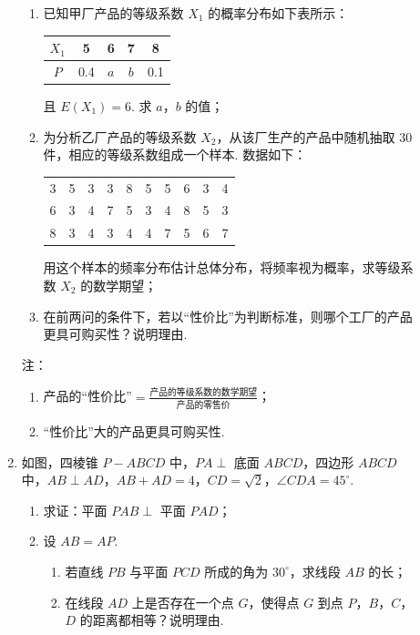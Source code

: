 \begin{description}
\begin{enumerate}[leftmargin=5pt]
\begin{enumerate}
\item 已知甲厂产品的等级系数 \(X_1\) 的概率分布如下表所示：

\begin{center}
\begin{tabular}{|c|c|c|c|c|}
\hline
\(X_1\) & 5 & 6 & 7 & 8 \\
\hline
\(P\) & 0.4 & \(a\) & \(b\) & 0.1 \\
\hline
\end{tabular}
\end{center}

且 \(E(X_1)=6\). 求 \(a\)，\(b\) 的值；
\item 为分析乙厂产品的等级系数 \(X_2\)，从该厂生产的产品中随机抽取 \(30\) 件，相应的等级系数组成一个样本. 数据如下：

\begin{center}
\begin{tabular}{cccccccccc}
3 & 5 & 3 & 3 & 8 & 5 & 5 & 6 & 3 & 4 \\
6 & 3 & 4 & 7 & 5 & 3 & 4 & 8 & 5 & 3 \\
8 & 3 & 4 & 3 & 4 & 4 & 7 & 5 & 6 & 7
\end{tabular}
\end{center}

用这个样本的频率分布估计总体分布，将频率视为概率，求等级系数 \(X_2\) 的数学期望；
\item 在前两问的条件下，若以“性价比”为判断标准，则哪个工厂的产品更具可购买性？说明理由.
\end{enumerate}

注：

\begin{enumerate}
\item 产品的“性价比”\(=\frac{\text{产品的等级系数的数学期望}}{\text{产品的零售价}}\)；
\item “性价比”大的产品更具可购买性.
\end{enumerate}

        \item 如图，四棱锥 \(P-ABCD\) 中，\(PA\perp\) 底面 \(ABCD\)，四边形 \(ABCD\) 中，\(AB\perp AD\)，\(AB+AD=4\)，\(CD=\sqrt{2}\)，\(\angle CDA=45^\circ\).

\begin{enumerate}
\item 求证：平面 \(PAB\perp\) 平面 \(PAD\)；
\item 设 \(AB=AP\).

\begin{enumerate}
\item 若直线 \(PB\) 与平面 \(PCD\) 所成的角为 \(30^\circ\)，求线段 \(AB\) 的长；
\item 在线段 \(AD\) 上是否存在一个点 \(G\)，使得点 \(G\) 到点 \(P\)，\(B\)，\(C\)，\(D\) 的距离都相等？说明理由.
\end{enumerate}
\end{enumerate}


\end{enumerate}
\end{description}

